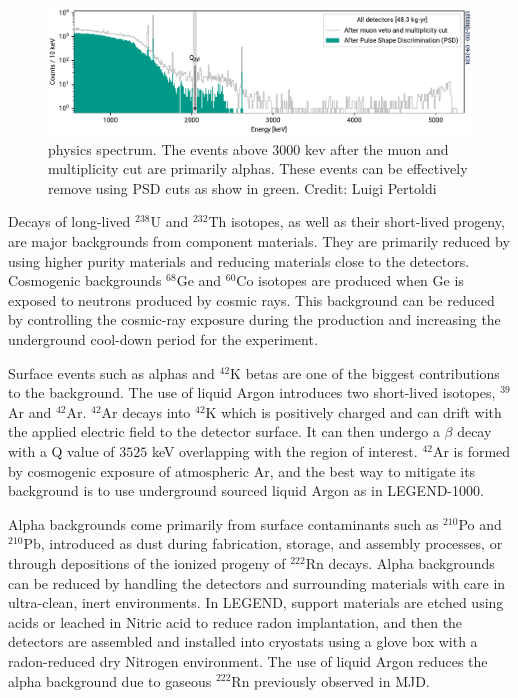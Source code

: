 \begin{figure}
\centering
  \includegraphics[width=0.99\linewidth]{ch2/figs/l200-phy-spectrum-psd.pdf}
  \caption{{\Ltwo} physics spectrum. The events above 3000 kev after the muon and multiplicity cut are primarily alphas. These events can be effectively remove using PSD cuts as show in green. Credit: Luigi Pertoldi}
\label{fig:L200_background}
  \end{figure}

  
Decays of long-lived $^{238}$U and $^{232}$Th isotopes, as well as their short-lived progeny, are major backgrounds from component materials. They are primarily reduced by using higher purity materials and reducing materials close to the detectors. Cosmogenic backgrounds $^{68}$Ge and $^{60}$Co isotopes are produced when Ge is exposed to neutrons produced by cosmic rays. This background can be reduced by controlling the cosmic-ray exposure during the production and increasing the underground cool-down period for the experiment. 

Surface events such as alphas and $^{42}$K betas are one of the biggest contributions to the background. The use of liquid Argon introduces two short-lived isotopes, $^{39}$Ar and $^{42}$Ar.  $^{42}$Ar decays into $^{42}$K which is positively charged and can drift with the applied electric field to the detector surface. It can then undergo a $\beta$ decay with a Q value of $3525$ keV overlapping with the region of interest. $^{42}$Ar is formed by cosmogenic exposure of atmospheric Ar, and the best way to mitigate its background is to use underground sourced liquid Argon as in LEGEND-1000.

Alpha backgrounds come primarily from surface contaminants such as $^{210}$Po and $^{210}$Pb, introduced as dust during fabrication, storage, and assembly processes, or through depositions of the ionized progeny of $^{222}$Rn decays. Alpha backgrounds can be reduced by handling the detectors and surrounding materials with care in ultra-clean, inert environments. In LEGEND, support materials are etched using acids or leached in Nitric acid to reduce radon implantation, and then the detectors are assembled and installed into cryostats using a glove box with a radon-reduced dry Nitrogen environment. The use of liquid Argon reduces the alpha background due to gaseous $^{222}$Rn previously observed in MJD.


